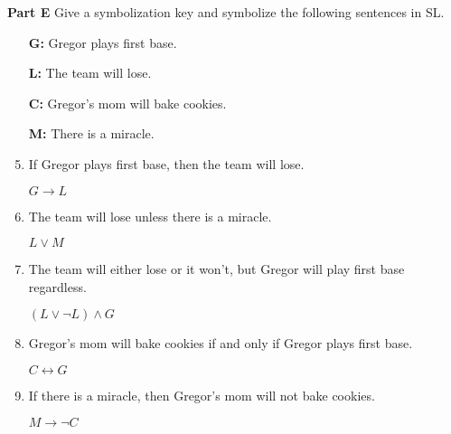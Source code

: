 \documentclass[12pt, letterpaper, twoside]{article}
\begin{document}
\noindent \textbf{Part E} Give a symbolization key and
symbolize the following sentences in SL.
\begin{enumerate}
	\item[\textbf{G:}] Gregor plays first base.
	\item[\textbf{L:}] The team will lose.
	\item[\textbf{C:}] Gregor's mom will bake cookies.
	\item[\textbf{M:}] There is a miracle.

	\item If Gregor plays first base, then the team will
          lose.

	$G \rightarrow L$

	\item The team will lose unless there is a miracle.

	$L \vee M$

	\item The team will either lose or it won't, but
          Gregor will play first base regardless.

	$(L \vee \neg L) \wedge G$

	\item Gregor's mom will bake cookies if and only if
          Gregor plays first base.

	$C \leftrightarrow G$

	\item If there is a miracle, then Gregor's mom will
          not bake cookies.

	$M \rightarrow \neg C$
\end{enumerate}
\end{document}
